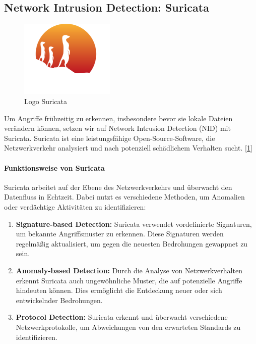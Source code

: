 \documentclass{article}
\begin{document}
\subsection{Network Intrusion Detection: Suricata}
\begin{figure}[ht]
    \centering
    \includegraphics[width=0.4\textwidth]{assets/Suricata.png}
    \caption[\href{https://suricata.io/wp-content/uploads/2021/01/Logo-FINAL_Vertical_Color_Whitetext.png}{Logo Suricata von Suricata}]{\label{fig:Suricata}Logo Suricata}
\end{figure}
Um Angriffe frühzeitig zu erkennen, insbesondere bevor sie lokale Dateien verändern können, setzen wir auf Network Intrusion Detection (NID) mit Suricata. Suricata ist eine leistungsfähige Open-Source-Software, die Netzwerkverkehr analysiert und nach potenziell schädlichem Verhalten sucht. [\ref{fig:Suricata}]

\paragraph{Funktionsweise von Suricata}
Suricata arbeitet auf der Ebene des Netzwerkverkehrs und überwacht den Datenfluss in Echtzeit. Dabei nutzt es verschiedene Methoden, um Anomalien oder verdächtige Aktivitäten zu identifizieren:

\begin{enumerate}
    \item \textbf{Signature-based Detection:} Suricata verwendet vordefinierte Signaturen, um bekannte Angriffsmuster zu erkennen. Diese Signaturen werden regelmäßig aktualisiert, um gegen die neuesten Bedrohungen gewappnet zu sein.
    \item \textbf{Anomaly-based Detection:} Durch die Analyse von Netzwerkverhalten erkennt Suricata auch ungewöhnliche Muster, die auf potenzielle Angriffe hindeuten können. Dies ermöglicht die Entdeckung neuer oder sich entwickelnder Bedrohungen.
    \item \textbf{Protocol Detection:} Suricata erkennt und überwacht verschiedene Netzwerkprotokolle, um Abweichungen von den erwarteten Standards zu identifizieren.
\end{enumerate}
\end{document}

